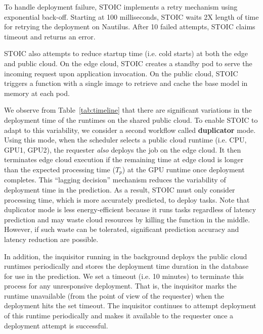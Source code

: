 To handle deployment failure, STOIC implements a retry mechanism using exponential back-off. Starting at 100 milliseconds, STOIC waits 2X length of time for retrying the deployment on Nautilus. After 10 failed attempts, STOIC claims timeout and returns an error.

STOIC also attempts to reduce startup time (i.e. cold starts) at both the edge and public cloud. On the edge cloud, STOIC creates a standby pod to serve the incoming request upon application invocation. On the public cloud, STOIC triggers a function with a single image to retrieve and cache the base model in memory at each pod.
 

We observe from Table~\ref{tab:timeline} that there are significant variations in the deployment time of the runtimes on the shared public cloud. To enable STOIC to adapt to this variability, we consider a second workflow called \textbf{duplicator} mode. Using this mode, when the scheduler selects a public cloud runtime (i.e. CPU, GPU1, GPU2), the requester \textit{also} deploys the job on the edge cloud. It then terminates edge cloud execution if the remaining time at edge cloud is longer than the expected processing time ($T_p$) at the GPU runtime once deployment completes. This ``lagging decision'' mechanism reduces the variability of deployment time in the prediction. As a result, STOIC must only consider processing time, which is more accurately predicted, to deploy tasks. Note that duplicator mode is less energy-efficient because it runs tasks regardless of latency prediction and may waste cloud resources by killing the function in the middle. However, if such waste can be tolerated, significant prediction accuracy and latency reduction are possible.

In addition, the inquisitor running in the background deploys the public cloud runtimes periodically and stores the deployment time duration in the database for use in the prediction. We set a timeout (i.e. 10 minutes) to terminate this process for any unresponsive deployment. That is, the inquisitor marks the runtime unavailable (from the point of view of the requester) when the deployment hits the set timeout. The inquisitor continues to attempt deployment of this runtime periodically and makes it available to the requester once a deployment attempt is successful.

